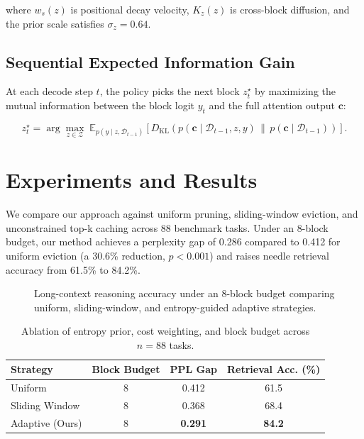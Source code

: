 \documentclass[11pt]{article}
\begin{document}
where $w_s(z)$ is positional decay velocity, $K_z(z)$ is cross-block diffusion, and the prior scale satisfies $\sigma_z = 0.64$.

\subsection{Sequential Expected Information Gain}
At each decode step $t$, the policy picks the next block $z_t^\star$ by maximizing the mutual information between the block logit $y_t$ and the full attention output $\mathbf{c}$:

\begin{equation}
\label{eq:eig}
z_t^\star = \arg\max_{z \in \mathcal{Z}} \; \mathbb{E}_{p(y \mid z, \mathcal{D}_{t-1})}\!\left[ D_{\text{KL}}\!\left(p(\mathbf{c} \mid \mathcal{D}_{t-1}, z, y) \,\|\, p(\mathbf{c} \mid \mathcal{D}_{t-1})\right) \right].
\end{equation}

\section{Experiments and Results}
\label{sec:results}

We compare our approach against uniform pruning, sliding-window eviction, and unconstrained top-k caching across 88 benchmark tasks. Under an 8-block budget, our method achieves a perplexity gap of 0.286 compared to 0.412 for uniform eviction (a 30.6\% reduction, $p < 0.001$) and raises needle retrieval accuracy from 61.5\% to 84.2\%.

\begin{figure}[t]
\caption{Long-context reasoning accuracy under an 8-block budget comparing uniform, sliding-window, and entropy-guided adaptive strategies.}
\label{fig:profile_overview}
\end{figure}

\begin{table}[t]
\caption{Ablation of entropy prior, cost weighting, and block budget across $n = 88$ tasks.}
\label{tab:ablation}
\begin{tabular}{lccc}
\toprule
Strategy & Block Budget & PPL Gap & Retrieval Acc. (\%) \\
\midrule
Uniform & 8 & 0.412 & 61.5 \\
Sliding Window & 8 & 0.368 & 68.4 \\
Adaptive (Ours) & 8 & \textbf{0.291} & \textbf{84.2} \\
\bottomrule
\end{tabular}
\end{table}
\end{document}
